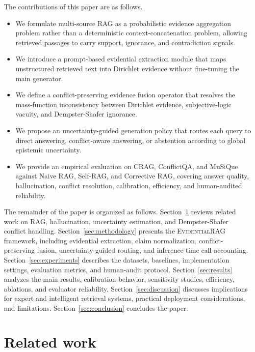 \documentclass[preprint,12pt,authoryear,nopreprintline]{elsarticle}
\newcommand{\ERAG}{\textsc{EvidentialRAG}}
\begin{document}
The contributions of this paper are as follows.
\begin{itemize}[leftmargin=0.55cm]
    \item We formulate multi-source RAG as a probabilistic evidence aggregation problem rather than a deterministic context-concatenation problem, allowing retrieved passages to carry support, ignorance, and contradiction signals.
    \item We introduce a prompt-based evidential extraction module that maps unstructured retrieved text into Dirichlet evidence without fine-tuning the main generator.
    \item We define a conflict-preserving evidence fusion operator that resolves the mass-function inconsistency between Dirichlet evidence, subjective-logic vacuity, and Dempster-Shafer ignorance.
    \item We propose an uncertainty-guided generation policy that routes each query to direct answering, conflict-aware answering, or abstention according to global epistemic uncertainty.
    \item We provide an empirical evaluation on CRAG, ConflictQA, and MuSiQue against Naive RAG, Self-RAG, and Corrective RAG, covering answer quality, hallucination, conflict resolution, calibration, efficiency, and human-audited reliability.
\end{itemize}

The remainder of the paper is organized as follows. Section~\ref{sec:related} reviews related work on RAG, hallucination, uncertainty estimation, and Dempster-Shafer conflict handling. Section~\ref{sec:methodology} presents the \ERAG{} framework, including evidential extraction, claim normalization, conflict-preserving fusion, uncertainty-guided routing, and inference-time call accounting. Section~\ref{sec:experiments} describes the datasets, baselines, implementation settings, evaluation metrics, and human-audit protocol. Section~\ref{sec:results} analyzes the main results, calibration behavior, sensitivity studies, efficiency, ablations, and evaluator reliability. Section~\ref{sec:discussion} discusses implications for expert and intelligent retrieval systems, practical deployment considerations, and limitations. Section~\ref{sec:conclusion} concludes the paper.

\section{Related work}
\label{sec:related}
\end{document}
